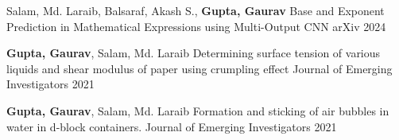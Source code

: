 

\begin{cventries}

  \cventry
  {Salam, Md. Laraib, Balsaraf, Akash S., \textbf{Gupta, Gaurav}} %
  {Base and Exponent Prediction in Mathematical Expressions using Multi-Output CNN} %
  {arXiv} %
  {2024} %
  {}

  \cventry
  {\textbf{Gupta, Gaurav}, Salam, Md. Laraib} %
  {Determining surface tension of various liquids and shear modulus of paper using crumpling effect} %
  {Journal of Emerging Investigators} %
  {2021} %
  {}

  \cventry
  {\textbf{Gupta, Gaurav}, Salam, Md. Laraib} %
  {Formation and sticking of air bubbles in water in d-block containers.} %
  {Journal of Emerging Investigators} %
  {2021} %
  {}
\end{cventries}
